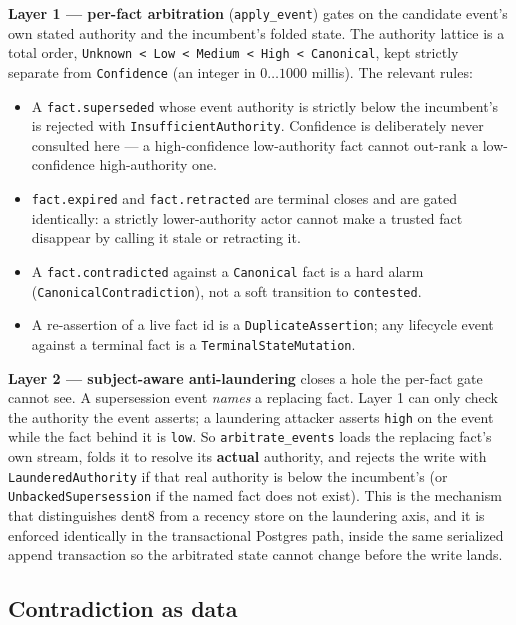 \documentclass[11pt]{article}
\newcommand{\code}[1]{\texttt{#1}}
\begin{document}
\textbf{Layer 1 --- per-fact arbitration} (\code{apply\_event}) gates on the candidate event's own stated authority and the incumbent's folded state. The authority lattice is a total order, \code{Unknown < Low < Medium < High < Canonical}, kept strictly separate from \code{Confidence} (an integer in $0\ldots1000$ millis). The relevant rules:

\begin{itemize}[leftmargin=*]
  \item A \code{fact.superseded} whose event authority is strictly below the incumbent's is rejected with \code{InsufficientAuthority}. Confidence is deliberately never consulted here --- a high-confidence low-authority fact cannot out-rank a low-confidence high-authority one.
  \item \code{fact.expired} and \code{fact.retracted} are terminal closes and are gated identically: a strictly lower-authority actor cannot make a trusted fact disappear by calling it stale or retracting it.
  \item A \code{fact.contradicted} against a \code{Canonical} fact is a hard alarm (\code{CanonicalContradiction}), not a soft transition to \code{contested}.
  \item A re-assertion of a live fact id is a \code{DuplicateAssertion}; any lifecycle event against a terminal fact is a \code{TerminalStateMutation}.
\end{itemize}

\textbf{Layer 2 --- subject-aware anti-laundering} closes a hole the per-fact gate cannot see. A supersession event \emph{names} a replacing fact. Layer 1 can only check the authority the event asserts; a laundering attacker asserts \code{high} on the event while the fact behind it is \code{low}. So \code{arbitrate\_events} loads the replacing fact's own stream, folds it to resolve its \textbf{actual} authority, and rejects the write with \code{LaunderedAuthority} if that real authority is below the incumbent's (or \code{UnbackedSupersession} if the named fact does not exist). This is the mechanism that distinguishes dent8 from a recency store on the laundering axis, and it is enforced identically in the transactional Postgres path, inside the same serialized append transaction so the arbitrated state cannot change before the write lands.

\subsection{Contradiction as data}
\end{document}
